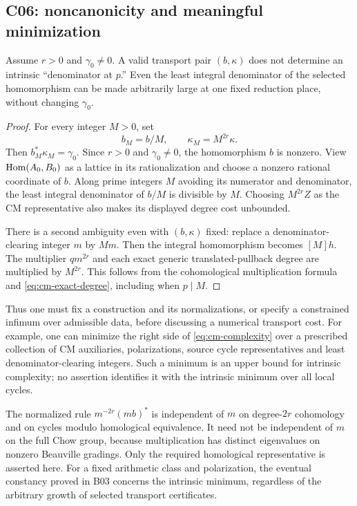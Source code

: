 \subsection{C06: noncanonicity and meaningful minimization}

\begin{proposition}[C06]
\label{prop:cm-noncanonical}
Assume $r>0$ and $\gamma_0\ne0$. A valid transport pair $(b,\kappa)$ does not determine an intrinsic ``denominator at $p$.'' Even the least integral denominator of the selected homomorphism can be made arbitrarily large at one fixed reduction place, without changing $\gamma_0$.
\end{proposition}

\begin{proof}
For every integer $M>0$, set
\[
b_M=b/M,\qquad \kappa_M=M^{2r}\kappa.
\]
Then $b_M^*\kappa_M=\gamma_0$. Since $r>0$ and $\gamma_0\ne0$, the homomorphism $b$ is nonzero. View $\operatorname{Hom}(A_0,B_0)$ as a lattice in its rationalization and choose a nonzero rational coordinate of $b$. Along prime integers $M$ avoiding its numerator and denominator, the least integral denominator of $b/M$ is divisible by $M$. Choosing $M^{2r}Z$ as the CM representative also makes its displayed degree cost unbounded.

There is a second ambiguity even with $(b,\kappa)$ fixed: replace a denominator-clearing integer $m$ by $Mm$. Then the integral homomorphism becomes $[M]h$. The multiplier $qm^{2r}$ and each exact generic translated-pullback degree are multiplied by $M^{2r}$. This follows from the cohomological multiplication formula and \eqref{eq:cm-exact-degree}, including when $p\mid M$.
\end{proof}

Thus one must fix a construction and its normalizations, or specify a constrained infimum over admissible data, before discussing a numerical transport cost. For example, one can minimize the right side of \eqref{eq:cm-complexity} over a prescribed collection of CM auxiliaries, polarizations, source cycle representatives and least denominator-clearing integers. Such a minimum is an upper bound for intrinsic complexity; no assertion identifies it with the intrinsic minimum over all local cycles.

The normalized rule $m^{-2r}(mb)^*$ is independent of $m$ on degree-$2r$ cohomology and on cycles modulo homological equivalence. It need not be independent of $m$ on the full Chow group, because multiplication has distinct eigenvalues on nonzero Beauville gradings. Only the required homological representative is asserted here. For a fixed arithmetic class and polarization, the eventual constancy proved in B03 concerns the intrinsic minimum, regardless of the arbitrary growth of selected transport certificates.

